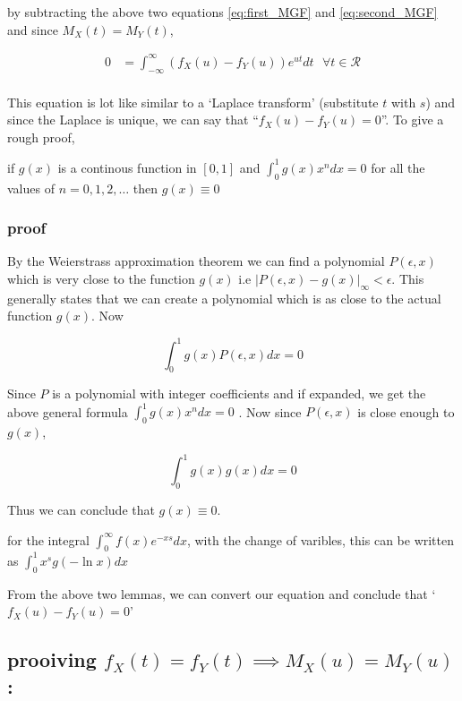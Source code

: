 \documentclass[openany]{book}
\begin{document}
	by subtracting the above two equations \ref{eq:first_MGF} and \ref{eq:second_MGF} and since $M_X(t) = M_Y(t)$,
	
	\begin{align*}
		0 &= \int_{-\infty}^{\infty}( f_X(u) - f_Y(u) )e^{ut} dt \text{ }\forall t \in \mathcal{R}\\  
	\end{align*}
	
	This equation is lot like similar to a `Laplace transform' (substitute $t$ with $s$) and since the 
	Laplace is unique, we can say that ``$f_X(u) - f_Y(u) = 0$''. To give a rough proof, 
	
	\begin{theorem}
		if $g(x)$ is a continous function in $[0, 1]$ and $\int_{0}^{1} g(x) x^n dx = 0$ for all the values of 
		$n = 0, 1, 2, \dots$ then $g(x) \equiv 0$
	\end{theorem}
	
	\subsubsection*{proof}
	By the Weierstrass approximation theorem we can find a polynomial $P(\epsilon, x)$ which is very close to 
	the function $g(x)$ i.e $|P(\epsilon, x)-g(x)|_{\infty} < \epsilon$. This generally states that we can create
	a polynomial which is as close to the actual function $g(x)$. Now 
	
	\[ \int_{0}^{1} g(x)P(\epsilon, x)dx = 0 \]
	
	Since $P$ is a polynomial with integer coefficients and if expanded, we get the above general formula $\int_{0}^{1} g(x) x^n dx = 0$
	. Now since $P(\epsilon, x)$ is close enough to $g(x)$, 
	
	\[ \int_{0}^{1} g(x)g(x)dx = 0 \]
	
	Thus we can conclude that $g(x) \equiv 0$.
	
	\begin{theorem}
		for the integral $\int_{0}^{\infty} f(x) e^{-xs}dx$, with the change of varibles, this can be written as 
		$\int_{0}^{1} x^s g(-\ln x)dx$
	\end{theorem}
	
	From the above two lemmas, we can convert our equation and conclude that `$f_X(u) - f_Y(u) = 0$'
	
	\subsection*{prooiving $f_X(t) = f_Y(t) \implies M_X(u) = M_Y(u)$:}
	
\end{document}
